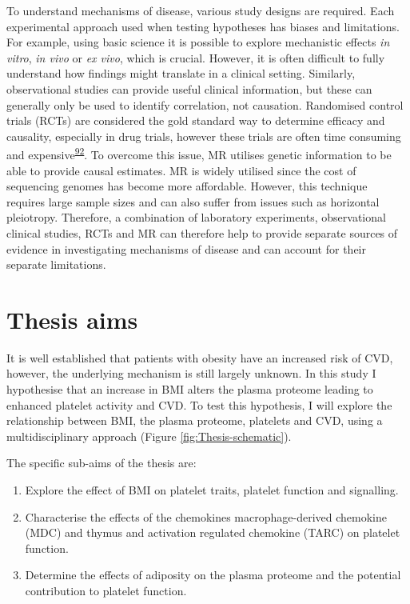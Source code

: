 \documentclass[11pt,twoside]{bristolthesis}
\providecommand{\tightlist}{%
  \setlength{\itemsep}{0pt}\setlength{\parskip}{0pt}}
\begin{document}
To understand mechanisms of disease, various study designs are required. Each experimental approach used when testing hypotheses has biases and limitations. For example, using basic science it is possible to explore mechanistic effects \emph{in vitro}, \emph{in vivo} or \emph{ex vivo}, which is crucial. However, it is often difficult to fully understand how findings might translate in a clinical setting. Similarly, observational studies can provide useful clinical information, but these can generally only be used to identify correlation, not causation. Randomised control trials (RCTs) are considered the gold standard way to determine efficacy and causality, especially in drug trials, however these trials are often time consuming and expensive\textsuperscript{\protect\hyperlink{ref-Bennett2017}{92}}. To overcome this issue, MR utilises genetic information to be able to provide causal estimates. MR is widely utilised since the cost of sequencing genomes has become more affordable. However, this technique requires large sample sizes and can also suffer from issues such as horizontal pleiotropy. Therefore, a combination of laboratory experiments, observational clinical studies, RCTs and MR can therefore help to provide separate sources of evidence in investigating mechanisms of disease and can account for their separate limitations.

\hypertarget{thesis-aims}{%
\section{Thesis aims}\label{thesis-aims}}

It is well established that patients with obesity have an increased risk of CVD, however, the underlying mechanism is still largely unknown. In this study I hypothesise that an increase in BMI alters the plasma proteome leading to enhanced platelet activity and CVD. To test this hypothesis, I will explore the relationship between BMI, the plasma proteome, platelets and CVD, using a multidisciplinary approach (Figure \ref{fig:Thesis-schematic}).

The specific sub-aims of the thesis are:
\begin{enumerate}
\def\labelenumi{\arabic{enumi})}
\tightlist
\item
  Explore the effect of BMI on platelet traits, platelet function and signalling.
\item
  Characterise the effects of the chemokines macrophage-derived chemokine (MDC) and thymus and activation regulated chemokine (TARC) on platelet function.
\item
  Determine the effects of adiposity on the plasma proteome and the potential contribution to platelet function.
\end{enumerate}
\end{document}
